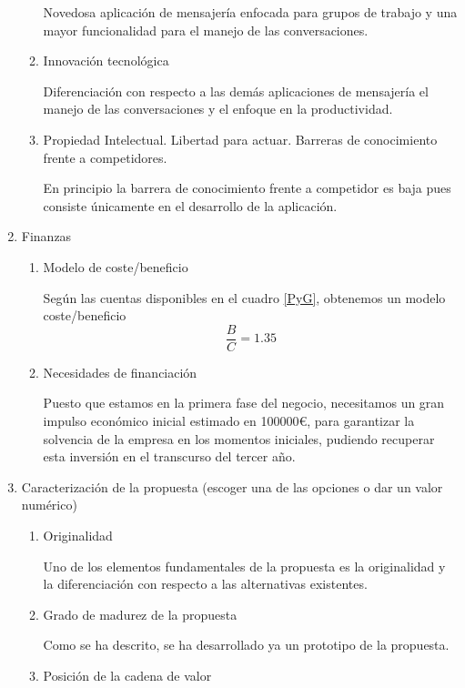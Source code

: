 \documentclass[11pt,leqno]{article}
\begin{document}
\begin{enumerate}
\begin{enumerate}[a]
	Novedosa aplicación de mensajería enfocada para grupos de trabajo
	y una mayor funcionalidad para el manejo de las conversaciones.
	
\item Innovación tecnológica

	Diferenciación con respecto a las demás aplicaciones de mensajería
	el manejo de las conversaciones y el enfoque en la productividad.
	
\item Propiedad Intelectual. Libertad para actuar. 
Barreras de conocimiento frente a competidores.

	En principio la barrera de conocimiento frente a competidor es 
	baja pues consiste únicamente en el desarrollo de la aplicación.
	
\end{enumerate}



\item Finanzas

\begin{enumerate}[a]
\item  Modelo de coste/beneficio

	Según las cuentas disponibles en el cuadro \ref{PyG}, obtenemos un
	modelo coste/beneficio
	\[ \frac{B}{C} = 1.35 	\]
	
\item  Necesidades de financiación 
	
	Puesto que estamos en la primera fase del negocio, necesitamos un gran impulso
	económico inicial estimado en 100000\euro, para garantizar la solvencia de la 
	empresa en los momentos iniciales, pudiendo recuperar esta inversión en el 
	transcurso del tercer año.
	
\end{enumerate}



\item Caracterización de la propuesta 
(escoger una de las opciones o dar un valor numérico)

\begin{enumerate}[a]
\item Originalidad

	Uno de los elementos fundamentales de la propuesta es la originalidad y
	la diferenciación con respecto a las alternativas existentes.
\item  Grado de madurez de la propuesta

	Como se ha descrito, se ha desarrollado ya un prototipo de
	la propuesta. 
\item Posición de la cadena de valor 


\end{enumerate}
\end{enumerate}
\end{document}
